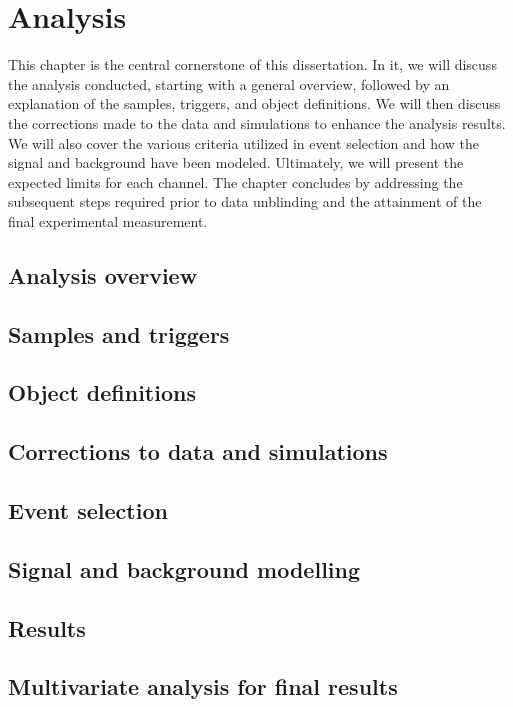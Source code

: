 \chapter[Analysis]{Analysis}

This chapter is the central cornerstone of this dissertation. In it, we will discuss the analysis conducted, starting with a general overview, followed by an explanation of the samples, triggers, and object definitions. We will then discuss the corrections made to the data and simulations to enhance the analysis results. We will also cover the various criteria utilized in event selection and how the signal and background have been modeled. Ultimately, we will present the expected limits for each channel. The chapter concludes by addressing the subsequent steps required prior to data unblinding and the attainment of the final experimental measurement.

\section{Analysis overview}

\section{Samples and triggers}


\section{Object definitions}


\section{Corrections to data and simulations}


\section{Event selection}


\section{Signal and background modelling}


\section{Results}

\section{Multivariate analysis for final results}


